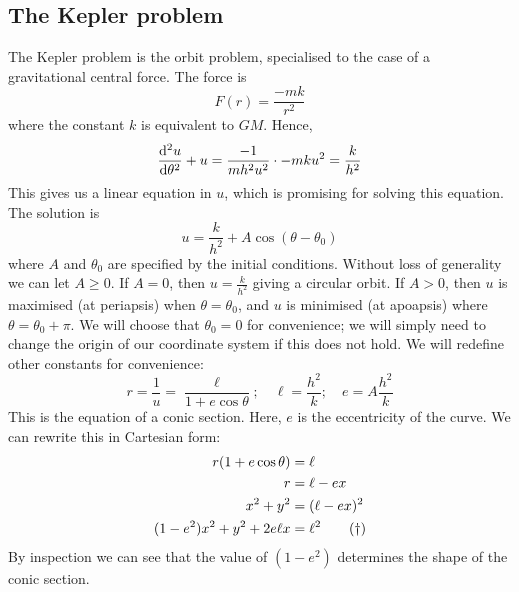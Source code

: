 \subsection{The Kepler problem}
The Kepler problem is the orbit problem, specialised to the case of a gravitational central force.
The force is
\[
	F(r) = \frac{-mk}{r^2}
\]
where the constant \(k\) is equivalent to \(GM\).
Hence,
\[
	\dv[2]{u}{\theta} + u = \frac{-1}{mh^2u^2} \cdot -mku^2 = \frac{k}{h^2}
\]
This gives us a linear equation in \(u\), which is promising for solving this equation.
The solution is
\[
	u = \frac{k}{h^2} + A\cos(\theta - \theta_0)
\]
where \(A\) and \(\theta_0\) are specified by the initial conditions.
Without loss of generality we can let \(A \geq 0\).
If \(A = 0\), then \(u = \frac{k}{h^2}\) giving a circular orbit.
If \(A > 0\), then \(u\) is maximised (at periapsis) when \(\theta = \theta_0\), and \(u\) is minimised (at apoapsis) where \(\theta = \theta_0 + \pi\).
We will choose that \(\theta_0 = 0\) for convenience; we will simply need to change the origin of our coordinate system if this does not hold.
We will redefine other constants for convenience:
\[
	r = \frac{1}{u} = \frac{\ell}{1 + e\cos \theta};\quad \ell = \frac{h^2}{k};\quad e = A\frac{h^2}{k}
\]
This is the equation of a conic section.
Here, \(e\) is the eccentricity of the curve.
We can rewrite this in Cartesian form:
\begin{align}
	r(1 + e\cos \theta)         & = \ell \notag              \\
	r                           & = \ell - ex \notag         \\
	x^2 + y^2                   & = (\ell - ex)^2 \notag     \\
	(1-e^2)x^2 + y^2 + 2e\ell x & = \ell^2 \tag{\(\dagger\)}
\end{align}
By inspection we can see that the value of \((1-e^2)\) determines the shape of the conic section.
